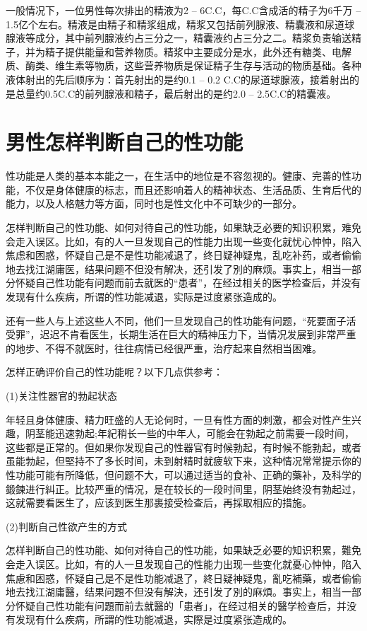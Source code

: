 \documentclass[12pt,UTF8]{ctexbook}
\begin{document}
一般情况下，一位男性每次排出的精液为2 -- 6C.C，每C.C含成活的精子为6千万 -- 1.5亿个左右。精液是由精子和精浆组成，精浆又包括前列腺液、精囊液和尿道球腺液等成分，其中前列腺液约占三分之一，精囊液约占三分之二。精浆负责输送精子，并为精子提供能量和营养物质。精浆中主要成分是水，此外还有糖类、电解质、酶类、维生素等物质，这些营养物质是保证精子生存与活动的物质基础。各种液体射出的先后顺序为：首先射出的是约0.1 -- 0.2 C.C的尿道球腺液，接着射出的是总量约0.5C.C的前列腺液和精子，最后射出的是约2.0 -- 2.5C.C的精囊液。

\section{男性怎样判断自己的性功能}

性功能是人类的基本本能之一，在生活中的地位是不容忽视的。健康、完善的性功能，不仅是身体健康的标志，而且还影响着人的精神状态、生活品质、生育后代的能力，以及人格魅力等方面，同时也是性文化中不可缺少的一部分。

怎样判断自己的性功能、如何对待自己的性功能，如果缺乏必要的知识积累，难免会走入误区。比如，有的人一旦发现自己的性能力出现一些变化就忧心忡忡，陷入焦虑和困惑，怀疑自己是不是性功能减退了，终日疑神疑鬼，乱吃补药，或者偷偷地去找江湖庸医，结果问题不但没有解决，还引发了別的麻烦。事实上，相当一部分怀疑自己性功能有问题而前去就医的“患者”，在经过相关的医学检查后，并没有发现有什么疾病，所谓的性功能减退，实际是过度紧张造成的。

还有一些人与上述这些人不同，他们一旦发现自己的性功能有问题，“死要面子活受罪”，迟迟不肯看医生，长期生活在巨大的精神压力下，当情况发展到非常严重的地步、不得不就医时，往往病情已经很严重，治疗起来自然相当困难。

怎样正确评价自己的性功能呢？以下几点供参考：

(1)关注性器官的勃起状态

年轻且身体健康、精力旺盛的人无论何时，一旦有性方面的刺激，都会对性产生兴趣，阴茎能迅速勃起;年紀稍长一些的中年人，可能会在勃起之前需要一段时间，这些都是正常的。但如果你发现自己的性器官有时候勃起，有时候不能勃起，或者虽能勃起，但堅持不了多长时间，未到射精时就疲软下来，这种情况常常提示你的性功能可能有所降低，但问题不大，可以通过适当的食补、正确的藥补，及科学的鍛鍊进行糾正。比较严重的情况，是在较长的一段时间里，阴茎始终没有勃起过，这就需要看医生了，应该到医生那裹接受检查后，再採取相应的措施。

(2)判断自己性欲产生的方式

怎样判断自己的性功能、如何对待自己的性功能，如果缺乏必要的知识积累，難免会走入误区。比如，有的人一旦发现自己的性能力出现一些变化就憂心忡忡，陷入焦慮和困惑，怀疑自己是不是性功能减退了，終日疑神疑鬼，亂吃補藥，或者偷偷地去找江湖庸醫，结果问題不但没有解決，还引发了別的麻煩。事实上，相当一部分怀疑自己性功能有问題而前去就醫的「患者」，在经过相关的醫学检查后，并没有发现有什么疾病，所謂的性功能减退，实際是过度紧张造成的。
\end{document}
